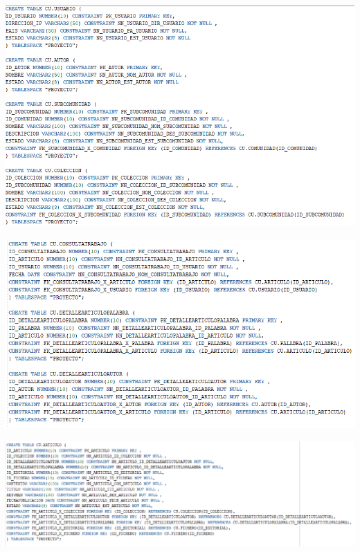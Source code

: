 \documentclass[12pt,letterpaper]{article}
\begin{document}
\begin{center}
	\includegraphics[width=15cm]{./Imagenes/5} 
\end{center}


\begin{center}
	\includegraphics[width=15cm]{./Imagenes/6} 
\end{center}


\begin{center}
	\includegraphics[width=15cm]{./Imagenes/7} 
\end{center}

 
\end{document}
